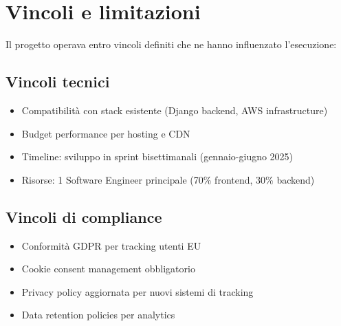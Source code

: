 \section{Vincoli e limitazioni}
Il progetto operava entro vincoli definiti che ne hanno influenzato 
l'esecuzione:

\subsection{Vincoli tecnici}
\begin{itemize}
  \item Compatibilità con stack esistente (Django backend, AWS 
        infrastructure)
  \item Budget performance per hosting e CDN
  \item Timeline: sviluppo in sprint bisettimanali (gennaio-giugno 2025)
  \item Risorse: 1 Software Engineer principale (70\% frontend, 
        30\% backend)
\end{itemize}

\subsection{Vincoli di compliance}
\begin{itemize}
  \item Conformità GDPR per tracking utenti EU
  \item Cookie consent management obbligatorio
  \item Privacy policy aggiornata per nuovi sistemi di tracking
  \item Data retention policies per analytics
\end{itemize}